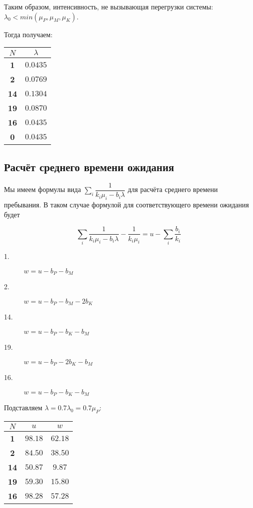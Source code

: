 \documentclass[12pt, a4paper] {ncc}
\begin{document}
	Таким образом, интенсивность, не вызывающая перегрузки системы:
	$\lambda_0 < min(\mu_P, \mu_M, \mu_K)$.

	Тогда получаем:

    \begin{tabular}{|c|c|}
    \hline
    $N$    & $\lambda$ \\ \hline
    \hline
    \bf 1  & $0.0435$ \\ \hline
    \bf 2  & $0.0769$ \\ \hline
    \bf 14 & $0.1304$ \\ \hline
    \bf 19 & $0.0870$ \\ \hline
    \bf 16 & $0.0435$ \\ \hline
    \hline
    \bf 0  & $0.0435$ \\ \hline
    \end{tabular}

\subsection{Расчёт среднего времени ожидания}

Мы имеем формулы вида $\sum\limits_i \dfrac{1}{k_i \mu_i - b_i \lambda}$ для
расчёта среднего времени пребывания. В таком случае формулой для
соответствующего времени ожидания будет

$$\sum\limits_i \dfrac{1}{k_i \mu_i - b_i\lambda} - \dfrac{1}{k_i \mu_i} =
u - \sum\limits_i \dfrac{b_i}{k_i}$$

\begin{description}
\item[1.]   $w = u - b_P - b_M$
\item[2.]   $w = u - b_P - b_M - 2 b_K$
\item[14.]  $w = u - b_P - b_K - b_M$
\item[19.]  $w = u - b_P - 2 b_K - b_M$
\item[16.]  $w = u - b_P - b_K - b_M$
\end{description}

Подставляем $\lambda = 0.7 \lambda_0 = 0.7 \mu_P$:

\begin{tabular}{|c|c|c|}
\hline
$N$    & $u$     & $w$     \\ \hline
\bf 1  & $98.18$ & $62.18$ \\ \hline
\bf 2  & $84.50$ & $38.50$ \\ \hline
\bf 14 & $50.87$ & $ 9.87$ \\ \hline
\bf 19 & $59.30$ & $15.80$ \\ \hline
\bf 16 & $98.28$ & $57.28$ \\ \hline
\end{tabular}
\end{document}
